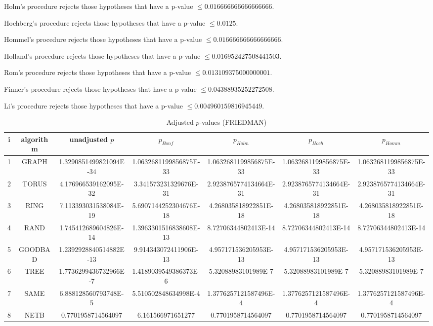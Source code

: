 \documentclass[a4paper,10pt]{article}
\begin{document}
\begin{landscape}
Holm's procedure rejects those hypotheses that have a p-value $\le0.016666666666666666$.


Hochberg's procedure rejects those hypotheses that have a p-value $\le0.0125$.


Hommel's procedure rejects those hypotheses that have a p-value $\le0.016666666666666666$.


Holland's procedure rejects those hypotheses that have a p-value $\le0.016952427508441503$.


Rom's procedure rejects those hypotheses that have a p-value $\le0.013109375000000001$.


Finner's procedure rejects those hypotheses that have a p-value $\le0.04388935252272508$.


Li's procedure rejects those hypotheses that have a p-value $\le0.004960159816945449$.



\newpage

\begin{table}[!htp]
\centering\scriptsize
\caption{Adjusted $p$-values (FRIEDMAN)}
\begin{tabular}{ccccccc}
i&algorithm&unadjusted $p$&$p_{Bonf}$&$p_{Holm}$&$p_{Hoch}$&$p_{Homm}$\\
\hline
1& GRAPH&1.3290851499821094E-34&1.0632681199856875E-33&1.0632681199856875E-33&1.0632681199856875E-33&1.0632681199856875E-33\\
2& TORUS&4.176966539162095E-32&3.341573231329676E-31&2.9238765774134664E-31&2.9238765774134664E-31&2.9238765774134664E-31\\
3& RING&7.113393031538084E-19&5.6907144252304676E-18&4.268035818922851E-18&4.268035818922851E-18&4.268035818922851E-18\\
4& RAND&1.745412689604826E-14&1.3963301516838608E-13&8.72706344802413E-14&8.72706344802413E-14&8.72706344802413E-14\\
5& GOODBAD&1.2392928840514882E-13&9.914343072411906E-13&4.957171536205953E-13&4.957171536205953E-13&4.957171536205953E-13\\
6& TREE&1.7736299436732966E-7&1.4189039549386373E-6&5.32088983101989E-7&5.32088983101989E-7&5.32088983101989E-7\\
7& SAME&6.888128560793748E-5&5.510502848634998E-4&1.3776257121587496E-4&1.3776257121587496E-4&1.3776257121587496E-4\\
8& NETB&0.7701958714564097&6.161566971651277&0.7701958714564097&0.7701958714564097&0.7701958714564097\\
\hline
\end{tabular}
\end{table}


\end{landscape}
\end{document}
